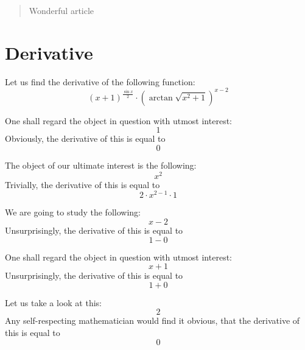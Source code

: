 \documentclass{article}
\begin{document}
\maketitle
\begin{abstract}
Wonderful article
\end{abstract}
\newpage
\section{Derivative}
Let us find the derivative of the following function:
\begin{equation}
\left( x + 1 \right) ^{\frac{\sin x }{2 } } \cdot \left( \arctan \sqrt {x ^{2 } + 1 } \right) ^{x - 2 } 
\end{equation}

One shall regard the object in question with utmost interest:
\begin{equation}
1 
\end{equation}
Obviously, the derivative of this is equal to
\begin{equation}
0 
\end{equation}

The object of our ultimate interest is the following:
\begin{equation}
x ^{2 } 
\end{equation}
Trivially, the derivative of this is equal to
\begin{equation}
2 \cdot x ^{2 - 1 } \cdot 1 
\end{equation}

We are going to study the following:
\begin{equation}
x - 2 
\end{equation}
Unsurprisingly, the derivative of this is equal to
\begin{equation}
1 - 0 
\end{equation}

One shall regard the object in question with utmost interest:
\begin{equation}
x + 1 
\end{equation}
Unsurprisingly, the derivative of this is equal to
\begin{equation}
1 + 0 
\end{equation}

Let us take a look at this:
\begin{equation}
2 
\end{equation}
Any self-respecting mathematician would find it obvious, that the derivative of this is equal to
\begin{equation}
0 
\end{equation}
\end{document}
